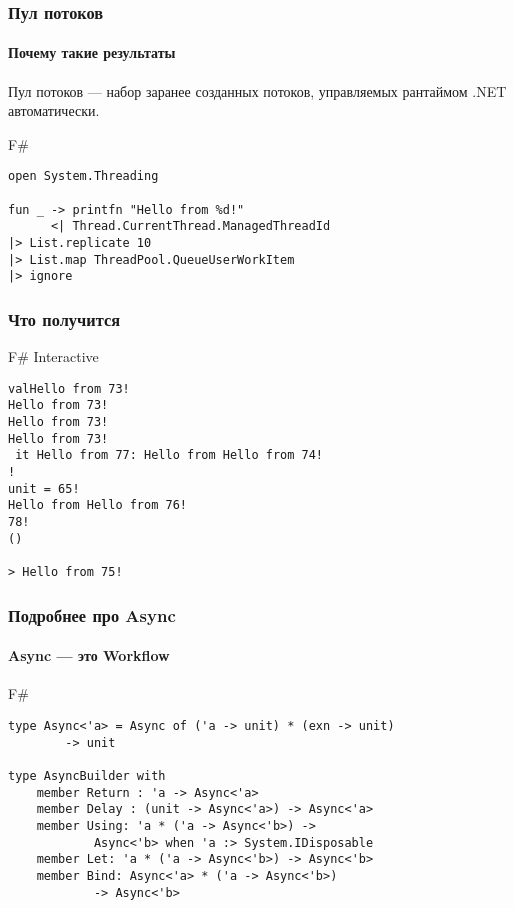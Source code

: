 \documentclass[xetex,mathserif,serif]{beamer}
\begin{document}
    \begin{frame}[fragile]
        \frametitle{Пул потоков}
        \framesubtitle{Почему такие результаты}
        Пул потоков --- набор заранее созданных потоков, управляемых рантаймом .NET автоматически.
        \begin{exampleblock}{F\#}
    		\begin{lstlisting}
open System.Threading

fun _ -> printfn "Hello from %d!" 
      <| Thread.CurrentThread.ManagedThreadId
|> List.replicate 10
|> List.map ThreadPool.QueueUserWorkItem 
|> ignore
\end{lstlisting}
\end{exampleblock}
\end{frame}

    \begin{frame}[fragile]
        \frametitle{Что получится}
   		\begin{alertblock}{F\# Interactive}
   			\begin{lstlisting}[keywordstyle=\color{black},emphstyle=\color{black}]
valHello from 73! 
Hello from 73! 
Hello from 73! 
Hello from 73! 
 it Hello from 77: Hello from Hello from 74! 
! 
unit = 65! 
Hello from Hello from 76! 
78! 
()

> Hello from 75! 
\end{lstlisting}
\end{alertblock}
\end{frame}

    \begin{frame}[fragile]
        \frametitle{Подробнее про Async}
        \framesubtitle{Async --- это Workflow}
        \begin{exampleblock}{F\#}
    		\begin{lstlisting}
type Async<'a> = Async of ('a -> unit) * (exn -> unit) 
        -> unit

type AsyncBuilder with
    member Return : 'a -> Async<'a>
    member Delay : (unit -> Async<'a>) -> Async<'a>
    member Using: 'a * ('a -> Async<'b>) -> 
            Async<'b> when 'a :> System.IDisposable
    member Let: 'a * ('a -> Async<'b>) -> Async<'b>
    member Bind: Async<'a> * ('a -> Async<'b>) 
            -> Async<'b>
\end{lstlisting}
\end{exampleblock}
\end{frame}
\end{document}
